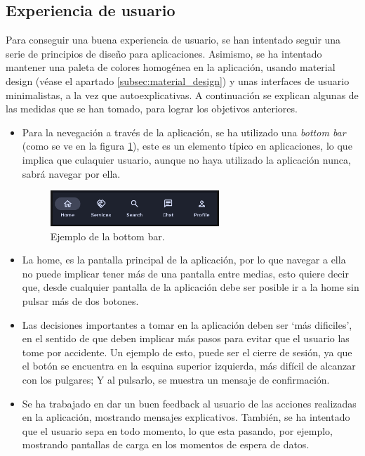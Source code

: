 \subsection{Experiencia de usuario}
Para conseguir una buena experiencia de usuario, se han intentado seguir una serie de principios de diseño para aplicaciones. Asimismo, se ha intentado mantener una paleta de colores homogénea en la aplicación, usando material design (véase el apartado \ref{subsec:material_design}) y  unas interfaces de usuario minimalistas, a la vez que autoexplicativas. A continuación se explican algunas de las medidas que se han tomado, para lograr los objetivos anteriores.
\begin{itemize}
    \item Para la nevegación a través de la aplicación, se ha utilizado una \textit{bottom bar} (como se ve en la figura \ref{fig:ejemplo_bottombar}), este es un elemento típico en aplicaciones, lo que implica que culaquier usuario, aunque no haya utilizado la aplicación nunca, sabrá navegar por ella.
    \begin{figure}[h]
        \centering
        \includegraphics[width = 0.6\textwidth]{Imagenes/Fuentes/ejemplo_bottombar.png}
        \caption{Ejemplo de la bottom bar.}
        \label{fig:ejemplo_bottombar}
    \end{figure}
    \item La home, es la pantalla principal de la aplicación, por lo que navegar a ella no puede implicar tener más de una pantalla entre medias, esto quiere decir que, desde cualquier pantalla de la aplicación debe ser posible ir a la home sin pulsar más de dos botones. 
    \item Las decisiones importantes a tomar en la aplicación deben ser ‘más dificiles’, en el sentido de que deben implicar más pasos para evitar que el usuario las tome por accidente. Un ejemplo de esto, puede ser el cierre de sesión, ya que el botón se encuentra en la esquina superior izquierda, más difícil de alcanzar con los pulgares; Y al pulsarlo, se muestra un mensaje de confirmación. 
    \item Se ha trabajado en dar un buen feedback al usuario de las acciones realizadas en la aplicación, mostrando mensajes explicativos. También, se ha intentado que el usuario sepa en todo momento, lo que esta pasando, por ejemplo, mostrando pantallas de carga en los momentos de espera de datos. 
\end{itemize}

